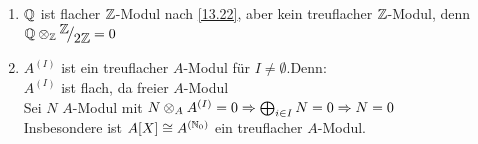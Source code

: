 \begin{bsp}
	\begin{enumerate} [label= \alph*)]
		\item $\mathbb{Q}$ ist flacher $\mathbb{Z}$-Modul nach \ref{13.22}, aber kein treuflacher $\mathbb{Z}$-Modul, denn $\Q \otimes_{\Z} \QR{\Z}{2\Z} = 0 $
		\item $A^{(I)}$ ist ein treuflacher $A$-Modul für $I \neq \emptyset $.Denn: \\
		$A^{(I)} $ ist flach, da freier $A$-Modul \\
		Sei $N$ $A$-Modul mit $ N \otimes_A A^{(I)} = 0 \Rightarrow \bigoplus_{i\in I} N = 0 \Rightarrow N = 0$ \\
		Insbesondere ist $A[X] \cong A^{(\mathbb{N}_0)} $ ein treuflacher $A$-Modul. 
	\end{enumerate}
\end{bsp}
\newpage
